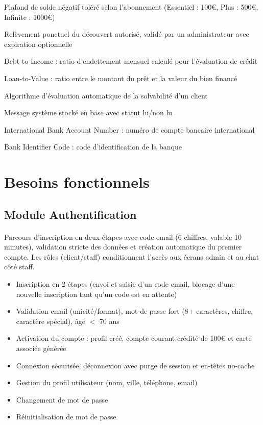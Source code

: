 \documentclass[12pt,a4paper]{report}
\begin{document}
\begin{description}[style=nextline, leftmargin=3cm]
    \item[Découvert autorisé] Plafond de solde négatif toléré selon l'abonnement (Essentiel : 100€, Plus : 500€, Infinite : 1000€)
    \item[Découvert temporaire] Relèvement ponctuel du découvert autorisé, validé par un administrateur avec expiration optionnelle
    \item[DTI] Debt-to-Income : ratio d'endettement mensuel calculé pour l'évaluation de crédit
    \item[LTV] Loan-to-Value : ratio entre le montant du prêt et la valeur du bien financé
    \item[Scoring] Algorithme d'évaluation automatique de la solvabilité d'un client
    \item[Notification] Message système stocké en base avec statut lu/non lu
    \item[IBAN] International Bank Account Number : numéro de compte bancaire international
    \item[BIC] Bank Identifier Code : code d'identification de la banque
\end{description}

\section{Besoins fonctionnels}

\subsection{Module Authentification}
\paragraph{}Parcours d'inscription en deux étapes avec code email (6 chiffres, valable 10 minutes), validation stricte des données et création automatique du premier compte. Les rôles (client/staff) conditionnent l'accès aux écrans admin et au chat côté staff.
\begin{itemize}[leftmargin=1.5cm]
    \item Inscription en 2 étapes (envoi et saisie d'un code email, blocage d'une nouvelle inscription tant qu'un code est en attente)
    \item Validation email (unicité/format), mot de passe fort (8+ caractères, chiffre, caractère spécial), âge $<$ 70 ans
    \item Activation du compte : profil créé, compte courant crédité de 100€ et carte associée générée
    \item Connexion sécurisée, déconnexion avec purge de session et en-têtes no-cache
    \item Gestion du profil utilisateur (nom, ville, téléphone, email)
    \item Changement de mot de passe
    \item Réinitialisation de mot de passe
\end{itemize}
\end{document}
